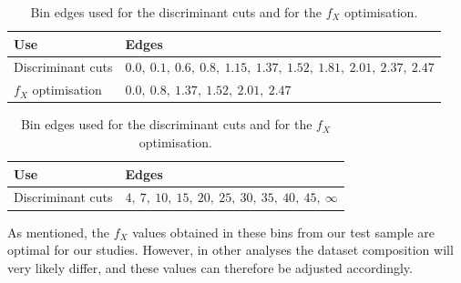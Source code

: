 \begin{table}[htbp]
  \centering
  \caption{Bin edges used for the discriminant cuts and for the $f_X$ optimisation.}
  \footnotesize
  \setlength{\tabcolsep}{5pt}
  \renewcommand{\arraystretch}{1.1}

  \begin{subtable}[t]{\linewidth}
    \centering
    \vspace{2pt}
    \begin{tabular}{@{}ll@{}}
      \toprule
      \textbf{Use} & \textbf{Edges} \\
      \midrule
      Discriminant cuts &
      $0.0,\ 0.1,\ 0.6,\ 0.8,\ 1.15,\ 1.37,\ 1.52,\ 1.81,\ 2.01,\ 2.37,\ 2.47$ \\
      $f_X$ optimisation &
      $0.0,\ 0.8,\ 1.37,\ 1.52,\ 2.01,\ 2.47$ \\
      \bottomrule
    \end{tabular}
  \end{subtable}

  \vspace{0.4cm} %

  \begin{subtable}[t]{\linewidth}
    \centering
    \vspace{2pt}
    \begin{tabular}{@{}ll@{}}
      \toprule
      \textbf{Use} & \textbf{Edges} \\
      \midrule
      Discriminant cuts &
      $4,\ 7,\ 10,\ 15,\ 20,\ 25,\ 30,\ 35,\ 40,\ 45,\ \infty$ \\
      \bottomrule
    \end{tabular}
  \end{subtable}
  \label{tune:binning}
\end{table}

As mentioned, the $f_{X}$ values obtained in these bins from our test sample are optimal for our studies. However, in other analyses the dataset composition will very likely differ, and these values can therefore be adjusted accordingly.  

